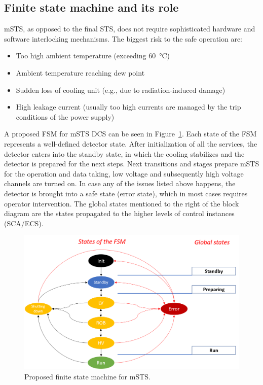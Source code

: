 \subsection{Finite state machine and its role}
\gls{mSTS}, as opposed to the final \gls{STS}, does not require sophisticated hardware and software interlocking mechanisms. The biggest risk to the safe operation are:
\begin{itemize}
    \item Too high ambient temperature (exceeding \SI{60}{\degreeCelsius})
    \item Ambient temperature reaching dew point 
    \item Sudden loss of cooling unit (e.g., due to radiation-induced damage)
    \item High leakage current (usually too high currents are managed by the trip conditions of the power supply)
\end{itemize}
A proposed \gls{FSM} for \gls{mSTS} \gls{DCS} can be seen in Figure~\ref{fig_FSM}. Each state of the \gls{FSM} represents a well-defined detector state. After initialization of all the services, the detector enters into the standby state, in which the cooling stabilizes and the detector is prepared for the next steps. Next transitions and stages prepare \gls{mSTS} for the operation and data taking, low voltage and subsequently high voltage channels are turned on. In case any of the issues listed above happens, the detector is brought into a safe state (error state), which in most cases requires operator intervention. The global states mentioned to the right of the block diagram are the states propagated to the higher levels of control instances (\gls{SCA}/\gls{ECS}).
\begin{figure}[h!]
\centering
\includegraphics[width=1\columnwidth]{Chapter6/DCS/images/FSM.png}
\caption{Proposed finite state machine for \gls{mSTS}. }
\label{fig_FSM}
\end{figure}

